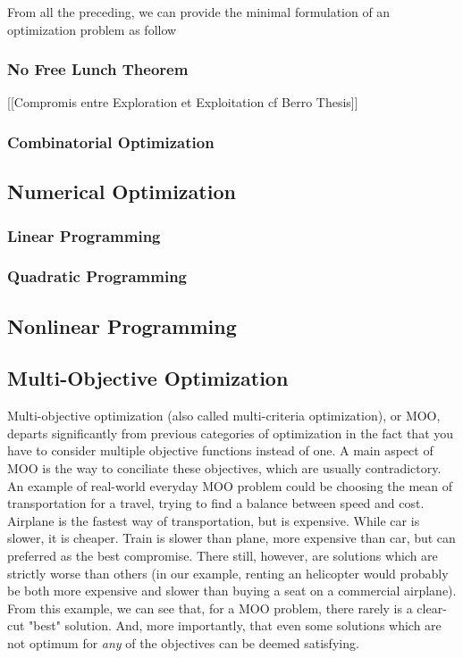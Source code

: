 From all the preceding, we can provide the minimal formulation of an optimization problem as follow 


\subsubsection{No Free Lunch Theorem}
[[Compromis entre Exploration et Exploitation cf Berro Thesis]]

\subsubsection{Combinatorial Optimization}

\subsection{Numerical Optimization}
\subsubsection{Linear Programming}
\subsubsection{Quadratic Programming}
\subsection{Nonlinear Programming}

\subsection{Multi-Objective Optimization}

Multi-objective optimization (also called multi-criteria optimization), or MOO, departs significantly from previous categories of optimization in the fact that you have to consider multiple objective functions instead of one. A main aspect of MOO is the way to conciliate these objectives, which are usually contradictory.
An example of real-world everyday MOO problem could be choosing the mean of transportation for a travel, trying to find a balance between speed and cost. Airplane is the fastest way of transportation, but is expensive. While car is slower, it is cheaper. Train is slower than plane, more expensive than car, but can preferred as the best compromise. There still, however, are solutions which are strictly worse than others (in our example, renting an helicopter would probably be both more expensive and slower than buying a seat on a commercial airplane).
From this example, we can see that, for a MOO problem, there rarely is a clear-cut "best" solution. And, more importantly, that even some solutions which are not optimum for \emph{any} of the objectives can be deemed satisfying. 

